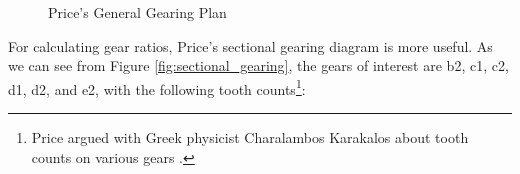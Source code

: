 \documentclass{article}
\theoremstyle{definition}
\begin{document}
\bigskip
\begin{figure} [H]
\caption{Price's General Gearing Plan \cite{gears_from_the_greeks}}
\label{fig:general_gearing_plan}
\end{figure}

\bigskip
\noindent
For calculating gear ratios, Price's sectional gearing diagram is
more useful. As we can see from Figure
\ref{fig:sectional_gearing}, the gears of interest are b2, c1,
c2, d1, d2, and e2, with the following tooth
counts\footnote{Price argued with Greek physicist Charalambos
Karakalos about tooth counts on various gears
\cite{youtube:freeth2021}.}:
\end{document}
